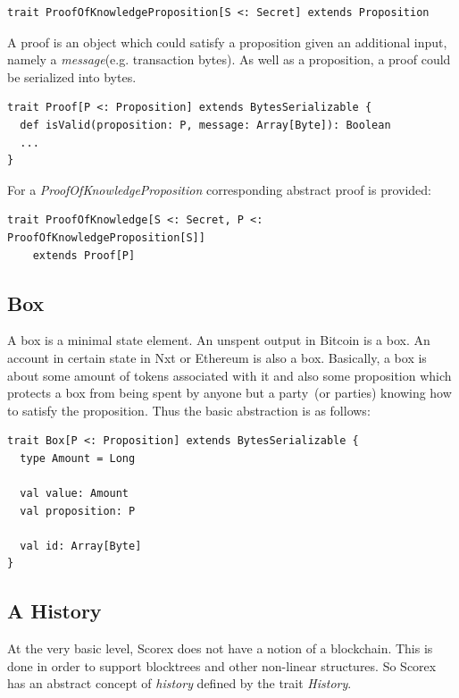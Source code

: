 \documentclass[]{report}   %
\begin{document}
\begin{lstlisting}
trait ProofOfKnowledgeProposition[S <: Secret] extends Proposition
\end{lstlisting}

A proof is an object which could satisfy a proposition given an additional input, namely a \textit{message}(e.g. transaction bytes). As well as a proposition, a proof could be serialized into bytes. 

\begin{lstlisting}
trait Proof[P <: Proposition] extends BytesSerializable {
  def isValid(proposition: P, message: Array[Byte]): Boolean
  ...
}
\end{lstlisting}

For a \textit{ProofOfKnowledgeProposition} corresponding abstract proof is provided:

\begin{lstlisting}
trait ProofOfKnowledge[S <: Secret, P <: ProofOfKnowledgeProposition[S]]
	extends Proof[P]
\end{lstlisting}

\subsection{Box}
\label{sect_box}

A box is a minimal state element. An unspent output in Bitcoin is a box. An account in certain state in Nxt or Ethereum is also a box. Basically, a box is about some amount of tokens associated with it and also some proposition which protects a box from being spent by anyone but a party~(or parties) knowing how to satisfy the proposition. Thus the basic abstraction is as follows:

\begin{lstlisting}
trait Box[P <: Proposition] extends BytesSerializable {
  type Amount = Long

  val value: Amount
  val proposition: P

  val id: Array[Byte]
}
\end{lstlisting}


\subsection{A History}

At the very basic level, Scorex does not have a notion of a blockchain. This is done in order to support blocktrees and other non-linear structures. So Scorex has an abstract concept of \textit{history} defined by the trait \textit{History}.
\end{document}
